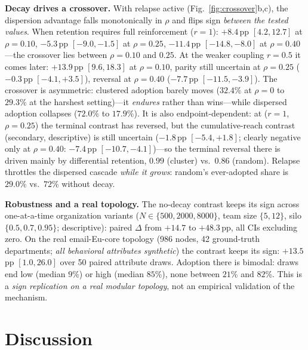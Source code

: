 \documentclass{llncs}
\begin{document}
\textbf{Decay drives a crossover.} With relapse active
(Fig.~\ref{fig:crossover}b,c), the dispersion advantage falls monotonically
in $\rho$ and flips sign \emph{between the tested values}. When retention
requires full reinforcement ($r{=}1$): $+8.4$\,pp $[4.2, 12.7]$ at
$\rho{=}0.10$, $\mathbf{-5.3}$\,pp $[-9.0, -1.5]$ at $\rho{=}0.25$,
$-11.4$\,pp $[-14.8, -8.0]$ at $\rho{=}0.40$---the crossover lies between
$\rho{=}0.10$ and $0.25$. At the weaker coupling $r{=}0.5$ it comes later:
$+13.9$\,pp $[9.6, 18.3]$ at $\rho{=}0.10$, parity still uncertain at
$\rho{=}0.25$ ($-0.3$\,pp $[-4.1, +3.5]$), reversal at $\rho{=}0.40$
($-7.7$\,pp $[-11.5, -3.9]$). The crossover is asymmetric: clustered
adoption barely moves ($32.4\%$ at $\rho{=}0$ to $29.3\%$ at the harshest
setting)---it \emph{endures} rather than wins---while dispersed adoption
collapses ($72.0\%$ to $17.9\%$). It is also endpoint-dependent: at
($r{=}1$, $\rho{=}0.25$) the terminal contrast has reversed, but the
cumulative-reach contrast (secondary, descriptive) is still uncertain
($-1.8$\,pp $[-5.4, +1.8]$; clearly negative only at $\rho{=}0.40$:
$-7.4$\,pp $[-10.7, -4.1]$)---so the terminal reversal there is driven mainly by
differential retention, $0.99$ (cluster) vs.\ $0.86$ (random). Relapse
throttles the dispersed cascade \emph{while it grows}: random's
ever-adopted share is $29.0$\% vs.\ $72$\% without decay.

\textbf{Robustness and a real topology.} The no-decay contrast keeps its
sign across one-at-a-time organization variants ($N\in\{500, 2000, 8000\}$,
team size $\{5, 12\}$, silo $\{0.5, 0.7, 0.95\}$; descriptive): paired
$\Delta$ from $+14.7$ to $+48.3$\,pp, all CIs excluding zero. On the real
email-Eu-core
topology (986 nodes, 42 ground-truth departments; \emph{all behavioral
attributes synthetic}) the contrast keeps its sign: $+13.5$\,pp
$[1.0, 26.0]$ over 50 paired attribute draws. Adoption there is bimodal:
draws end low (median $9$\%) or high (median $85$\%), none between
$21$\% and $82$\%. This is a \emph{sign replication
on a real modular topology}, not an empirical validation of the
mechanism.

\section{Discussion}
\label{sec:discussion}
\end{document}
